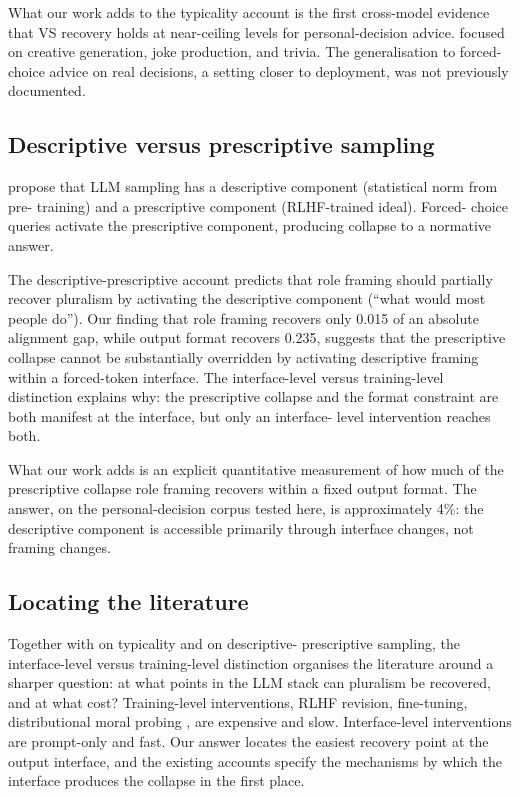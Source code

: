 What our work adds to the typicality account is the first cross-model
evidence that VS recovery holds at near-ceiling levels for
personal-decision advice. \citet{zhang-2025-verbalized-sampling}
focused on creative generation, joke production, and trivia. The
generalisation to forced-choice advice on real decisions, a setting
closer to deployment, was not previously documented.

\subsection{Descriptive versus prescriptive sampling}
\label{sec:disc_descriptive}

\citet{sivaprasad-2025-descriptive-prescriptive} propose that LLM
sampling has a descriptive component (statistical norm from pre-
training) and a prescriptive component (RLHF-trained ideal). Forced-
choice queries activate the prescriptive component, producing
collapse to a normative answer.

The descriptive-prescriptive account predicts that role framing
should partially recover pluralism by activating the descriptive
component (``what would most people do''). Our finding that role
framing recovers only 0.015 of an absolute alignment gap, while output
format recovers 0.235, suggests that the prescriptive collapse cannot
be substantially overridden by activating descriptive framing within a
forced-token interface. The interface-level versus training-level
distinction explains why: the prescriptive collapse and the format
constraint are both manifest at the interface, but only an interface-
level intervention reaches both.

What our work adds is an explicit quantitative measurement of how much
of the prescriptive collapse role framing recovers within a fixed
output format. The answer, on the personal-decision corpus tested
here, is approximately 4\%: the descriptive component is accessible
primarily through interface changes, not framing changes.

\subsection{Locating the literature}
\label{sec:disc_locating}

Together with \citet{zhang-2025-verbalized-sampling} on typicality and
\citet{sivaprasad-2025-descriptive-prescriptive} on descriptive-
prescriptive sampling, the interface-level versus training-level
distinction organises the literature around a sharper question: at
what points in the LLM stack can pluralism be recovered, and at what
cost? Training-level interventions, RLHF revision, fine-tuning,
distributional moral probing \citep{russo-2026-pluralistic}, are
expensive and slow. Interface-level interventions are prompt-only and
fast. Our answer locates the easiest recovery point at the output
interface, and the existing accounts specify the mechanisms by which
the interface produces the collapse in the first place.

